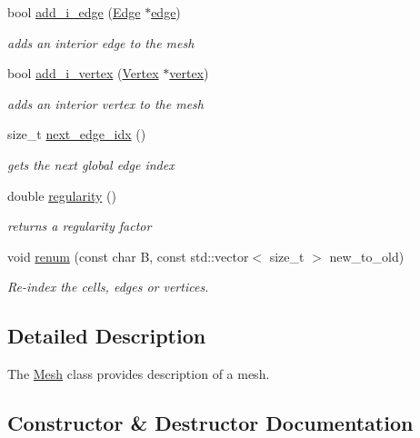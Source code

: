 \begin{DoxyCompactItemize}
bool \hyperlink{group__Mesh_ga1e55100bee1027f4ab3980bf020c5df7}{add\+\_\+i\+\_\+edge} (\hyperlink{classHArDCore2D_1_1Edge}{Edge} $\ast$\hyperlink{classHArDCore2D_1_1Mesh_acad7cdf3d2c00fa6fc23ff77c63c7d1a}{edge})
\begin{DoxyCompactList}\small\item\em adds an interior edge to the mesh \end{DoxyCompactList}\item 
bool \hyperlink{group__Mesh_gae0eac0c28f63b2106e97e595cb95248e}{add\+\_\+i\+\_\+vertex} (\hyperlink{classHArDCore2D_1_1Vertex}{Vertex} $\ast$\hyperlink{classHArDCore2D_1_1Mesh_ad099224c697c05a57fad6a47fdcd9e76}{vertex})
\begin{DoxyCompactList}\small\item\em adds an interior vertex to the mesh \end{DoxyCompactList}\item 
size\+\_\+t \hyperlink{group__Mesh_ga950e099c278cd367de1a87c6dcaefafe}{next\+\_\+edge\+\_\+idx} ()
\begin{DoxyCompactList}\small\item\em gets the next global edge index \end{DoxyCompactList}\item 
double \hyperlink{classHArDCore2D_1_1Mesh_a9bdfdf3e4528832da6925f96edc5ad8f}{regularity} ()
\begin{DoxyCompactList}\small\item\em returns a regularity factor \end{DoxyCompactList}\item 
void \hyperlink{classHArDCore2D_1_1Mesh_af77873bbc892a7a5b37bf4773c55aefc}{renum} (const char B, const std\+::vector$<$ size\+\_\+t $>$ new\+\_\+to\+\_\+old)
\begin{DoxyCompactList}\small\item\em Re-\/index the cells, edges or vertices. \end{DoxyCompactList}\end{DoxyCompactItemize}


\subsection{Detailed Description}
The \hyperlink{classHArDCore2D_1_1Mesh}{Mesh} class provides description of a mesh. 

\subsection{Constructor \& Destructor Documentation}
\mbox{\label{classHArDCore2D_1_1Mesh_a2af137f1571af89172b9c102302c416b}} 
